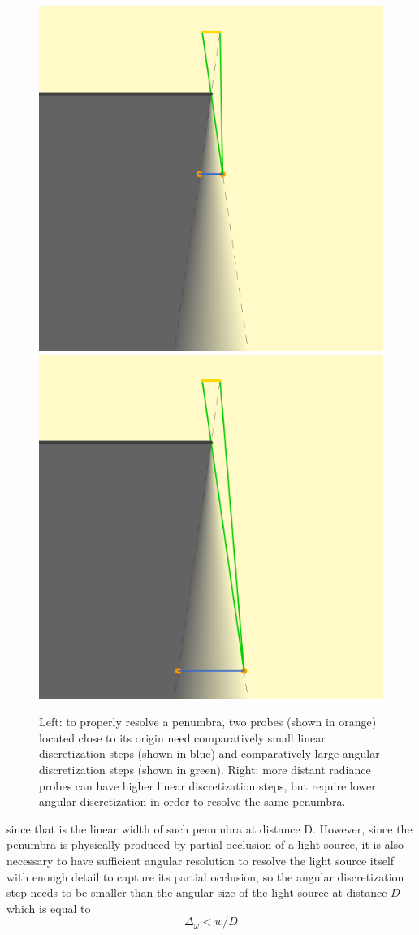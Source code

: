 \documentclass{jcgt}
\begin{document}
\begin{figure}[htb]
  \centering
  \includegraphics[width=0.49\columnwidth]{images/penumbra probes 1.png}
  \includegraphics[width=0.49\columnwidth]{images/penumbra probes 2.png}
  \caption{\label{fig:penumbra2}
  Left: to properly resolve a penumbra, two probes (shown in orange) located close to its origin need comparatively small linear discretization steps (shown in blue) and comparatively large angular discretization steps (shown in green). Right: more distant radiance probes can have higher linear discretization steps, but require lower angular discretization in order to resolve the same penumbra.}
\end{figure}
since that is the linear width of such penumbra at distance D. However, since the penumbra is physically produced by partial occlusion of a light source, it is also necessary to have sufficient angular resolution to resolve the light source itself with enough detail to capture its partial occlusion, so the angular discretization step needs to be smaller than the angular size of the light source at distance $D$ which is equal to
\begin{equation}
  \Delta_\omega < w/D
  \label{eq:delta_w_big}
\end{equation}
\end{document}

